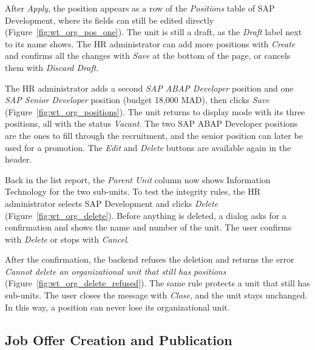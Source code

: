 
After \emph{Apply}, the position appears as a row of the \emph{Positions} table of SAP Development, where its fields can still be edited directly (Figure~\ref{fig:wt_org_pos_one}). The unit is still a draft, as the \emph{Draft} label next to its name shows. The HR administrator can add more positions with \emph{Create} and confirms all the changes with \emph{Save} at the bottom of the page, or cancels them with \emph{Discard Draft}.


The HR administrator adds a second \emph{SAP ABAP Developer} position and one \emph{SAP Senior Developer} position (budget 18,000 MAD), then clicks \emph{Save} (Figure~\ref{fig:wt_org_positions}). The unit returns to display mode with its three positions, all with the status \emph{Vacant}. The two SAP ABAP Developer positions are the ones to fill through the recruitment, and the senior position can later be used for a promotion. The \emph{Edit} and \emph{Delete} buttons are available again in the header.


Back in the list report, the \emph{Parent Unit} column now shows Information Technology for the two sub-units. To test the integrity rules, the HR administrator selects SAP Development and clicks \emph{Delete} (Figure~\ref{fig:wt_org_delete}). Before anything is deleted, a dialog asks for a confirmation and shows the name and number of the unit. The user confirms with \emph{Delete} or stops with \emph{Cancel}.


After the confirmation, the backend refuses the deletion and returns the error \emph{Cannot delete an organizational unit that still has positions} (Figure~\ref{fig:wt_org_delete_refused}). The same rule protects a unit that still has sub-units. The user closes the message with \emph{Close}, and the unit stays unchanged. In this way, a position can never lose its organizational unit.

\subsection{Job Offer Creation and Publication}
\label{subsec:wt_offer}

